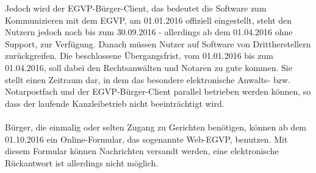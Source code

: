 Jedoch wird der EGVP-Bürger-Client, das bedeutet die Software zum Kommunizieren mit dem EGVP, am 01.01.2016 offiziell eingestellt, steht den Nutzern jedoch noch bis zum 30.09.2016 - allerdings ab dem 01.04.2016 ohne Support, zur Verfügung. Danach müssen Nutzer auf Software von Drittherstellern zurückgreifen. Die beschlossene Übergangsfrist, vom 01.01.2016 bis zum 01.04.2016, soll dabei den Rechtsanwälten und Notaren zu gute kommen. Sie stellt einen Zeitraum dar, in dem das besondere elektronische Anwalts- bzw. Notarpostfach und der EGVP-Bürger-Client parallel betrieben werden können, so dass der laufende Kanzleibetrieb nicht beeinträchtigt wird. \\
\\
Bürger, die einmalig oder selten Zugang zu Gerichten benötigen, können ab dem 01.10.2016 ein Online-Formular, das sogenannte Web-EGVP, benutzen. Mit diesem Formular können Nachrichten versandt werden, eine elektronische Rückantwort ist allerdings nicht möglich.